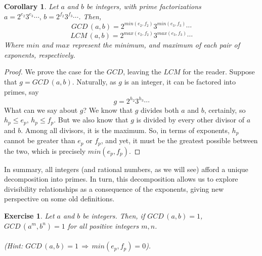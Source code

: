 \documentclass{article}
\newtheorem{corollary}{Corollary}
\newtheorem*{exe}{Exercise}
\newcommand{\GCD}[2]{GCD\,(#1, #2)}
\newcommand{\LCM}[2]{LCM\,(#1, #2)}
\begin{document}
\begin{mdframed} 
\begin{corollary} 
Let $a$ and $b$ be integers, with prime factorizations $a = 2^{e_2}3^{e_3}\cdots, \, b = 2^{f_2}3^{f_3}\cdots$. Then, 
\[\GCD{a}{b} = 2^{min(e_2, f_2)}3^{min(e_3, f_3)}\cdots \]
\[\LCM{a}{b} = 2^{max(e_2, f_2)}3^{max(e_3, f_3)}\cdots \]
Where $min$ and $max$ represent the minimum, and maximum of each pair of exponents, respectively. 
\end{corollary} 
\begin{proof} 
We prove the case for the $GCD$, leaving the $LCM$ for the reader. Suppose that $g = \GCD{a}{b}$. Naturally, as $g$ is an integer, it can be factored into primes, say 
\[g = 2^{h_2}3^{h_3}\cdots\]
What can we say about $g$? We know that $g$ divides both $a$ and $b$, certainly, so $h_p \leq e_p, \, h_p \leq f_p$. But we also know that $g$ is divided by every other divisor of $a$ and $b$. Among all divisors, it is the maximum. So, in terms of exponents, $h_p$ cannot be greater than $e_p$ or $f_p$, and yet, it must be the greatest possible between the two, which is precisely $min(e_p, f_p)$. 
\end{proof} 
\end{mdframed} 
In summary, all integers (and rational numbers, as we will see) afford a unique decomposition into primes. In turn, this decomposition allows us to explore divisibility relationships as a consequence of the exponents, giving new perspective on some old definitions. 
\begin{mdframed} 
\begin{exe} 
Let $a$ and $b$ be integers. Then, if $\GCD{a}{b} = 1$, $\GCD{a^m}{b^n} = 1$ for all positive integers $m, n$. \\\\ (Hint: $\GCD{a}{b} = 1 \,\Rightarrow\, min(e_p, f_p) = 0$). 
\end{exe} 
\end{mdframed}  
\end{document}
